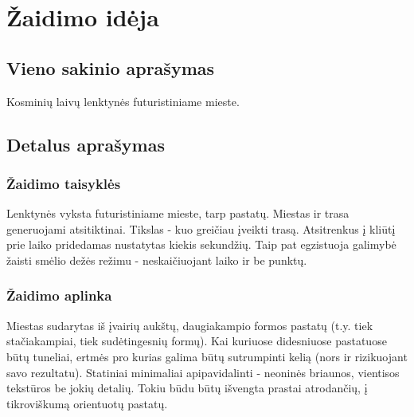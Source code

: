 \section{Žaidimo idėja}
\subsection{Vieno sakinio aprašymas}

Kosminių laivų lenktynės futuristiniame mieste.

\subsection{Detalus aprašymas}





\subsubsection{Žaidimo taisyklės}

Lenktynės vyksta futuristiniame mieste, tarp pastatų.
Miestas ir trasa generuojami atsitiktinai.
Tikslas - kuo greičiau įveikti trasą.
Atsitrenkus į kliūtį prie laiko pridedamas nustatytas kiekis sekundžių.
Taip pat egzistuoja galimybė žaisti smėlio dežės režimu - neskaičiuojant laiko ir be punktų.

\subsubsection{Žaidimo aplinka}

Miestas sudarytas iš įvairių aukštų, daugiakampio formos pastatų (t.y. tiek stačiakampiai, tiek sudėtingesnių formų).
Kai kuriuose didesniuose pastatuose būtų tuneliai, ertmės pro kurias galima būtų sutrumpinti kelią
(nors ir rizikuojant savo rezultatu).
Statiniai minimaliai apipavidalinti - neoninės briaunos, vientisos tekstūros be jokių detalių.
Tokiu būdu būtų išvengta prastai atrodančių, į tikroviškumą orientuotų pastatų.

